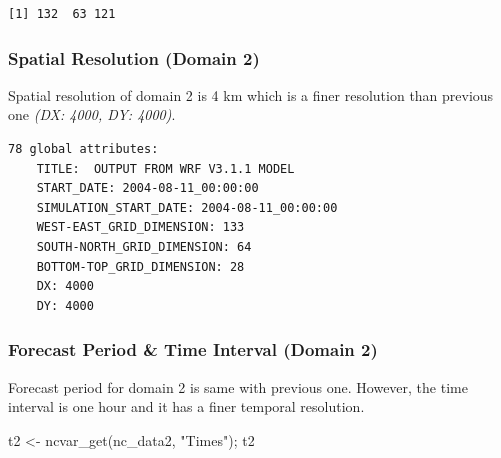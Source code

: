 \documentclass[
  letterpaper,
  DIV=11,
  numbers=noendperiod,
  abstract]{scrartcl}
\newenvironment{Shaded}{\begin{snugshade}}{\end{snugshade}}
\newcommand{\FunctionTok}[1]{\textcolor[rgb]{0.28,0.35,0.67}{#1}}
\newcommand{\NormalTok}[1]{\textcolor[rgb]{0.00,0.23,0.31}{#1}}
\newcommand{\OtherTok}[1]{\textcolor[rgb]{0.00,0.23,0.31}{#1}}
\newcommand{\StringTok}[1]{\textcolor[rgb]{0.13,0.47,0.30}{#1}}
\begin{document}
\begin{verbatim}
[1] 132  63 121
\end{verbatim}

\hypertarget{spatial-resolution-domain-2}{%
\subsubsection{Spatial Resolution (Domain
2)}\label{spatial-resolution-domain-2}}

Spatial resolution of domain 2 is 4 km which is a finer resolution than
previous one \emph{(DX: 4000, DY: 4000)}.

\begin{verbatim}
78 global attributes:
    TITLE:  OUTPUT FROM WRF V3.1.1 MODEL
    START_DATE: 2004-08-11_00:00:00
    SIMULATION_START_DATE: 2004-08-11_00:00:00
    WEST-EAST_GRID_DIMENSION: 133
    SOUTH-NORTH_GRID_DIMENSION: 64
    BOTTOM-TOP_GRID_DIMENSION: 28
    DX: 4000
    DY: 4000
\end{verbatim}

\hypertarget{forecast-period-time-interval-domain-2}{%
\subsubsection{Forecast Period \& Time Interval (Domain
2)}\label{forecast-period-time-interval-domain-2}}

Forecast period for domain 2 is same with previous one. However, the
time interval is one hour and it has a finer temporal resolution.

\begin{Shaded}
\begin{Highlighting}[]
\NormalTok{t2 }\OtherTok{\textless{}{-}} \FunctionTok{ncvar\_get}\NormalTok{(nc\_data2, }\StringTok{"Times"}\NormalTok{); t2}
\end{Highlighting}
\end{Shaded}
\end{document}
